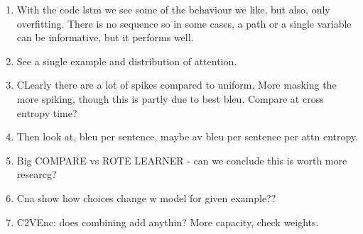 \begin{enumerate}
    \item With the code lstm we see some of the behaviour we like, but also, only overfitting. There is no sequence so in some cases, a path or a single variable can be informative, but it performs well.
    \item See a single example and distribution of attention.
    \item CLearly there are a lot of spikes compared to uniform. More masking the more spiking, though this is partly due to best bleu. Compare at cross entropy time?
    \item Then look at, bleu per sentence, maybe av bleu per sentence per attn entropy.
    \item Big COMPARE vs ROTE LEARNER - can we conclude this is worth more researcg?
    \item Cna show how choices change w model for given example??

    \item C2VEnc: does combining add anythin? More capacity, check weights.
\end{enumerate}






